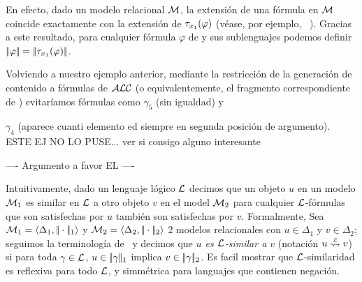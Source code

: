En efecto, dado un modelo relacional $\mathcal{M}$, la extensi\'on de una f\'ormula \ALC en $\mathcal{M}$ coincide exactamente con la extensi\'on
 de $\mathit{\tau}_{x_1}(\varphi)$ (v\'ease, por ejemplo, ~\cite{baad:desc03}). Gracias
a este resultado, para cualquier f\'ormula $\varphi$ de \ALC y sus sublenguajes podemos definir 
$|\!|\varphi|\!| = |\!|\mathit{\tau}_{x_1}(\varphi)|\!|$.




 Volviendo a nuestro ejemplo anterior, mediante la restricci\'on de la generaci\'on de contenido
a f\'ormulas de $\mathcal{ALC}$ (o equivalentemente, el fragmento correspondiente de \FOL)
evitar\'iamos f\'ormulas como
$\gamma_5$ (sin igualdad) y

$\gamma_4$ (aparece cuanti elemento ed
siempre en segunda posici\'on de argumento). ESTE EJ NO LO PUSE... ver si consigo alguno interesante







----
Argumento a favor EL
----

Intuitivamente, dado un lenguaje l\'ogico $\mathcal{L}$ decimos que un objeto $u$ en un modelo
$\mathcal{M}_1$ es similar en $\mathcal{L}$ a otro objeto
 $v$ en el model $\mathcal{M}_2$ para cualquier $\mathcal{L}$-f\'ormulas que son satisfechas por $u$ tambi\'en son satisfechas por $v$. Formalmente,
Sea $\mathcal{M}_1 = \langle \Delta_1, |\!|\cdot|\!|_1 \rangle$ y $\mathcal{M}_2 = \langle \Delta_2, |\!|\cdot|\!|_2 \rangle$ 2 modelos relacionales con $u \in \Delta_1$ y $v \in \Delta_2$; seguimos la terminolog\'ia de~\cite{AKS08} y decimos que
\emph{$u$ es $\mathcal{L}$-similar a $v$}  (notaci\'on $u \simil{\+L} v$) si para toda $\gamma \in \mathcal{L}$, $u \in |\!|\gamma|\!|_1$ implica
$v \in |\!|\gamma|\!|_2$. Es facil mostrar que
$\mathcal{L}$-similaridad es reflexiva para todo $\mathcal{L}$, y simm\'etrica  para languajes que contienen negaci\'on.


